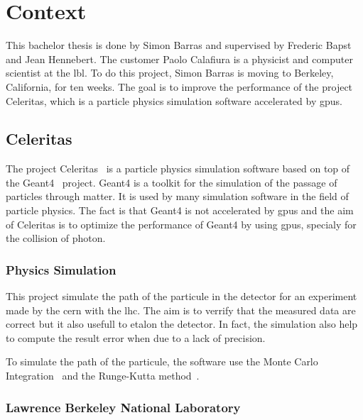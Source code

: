 \chapter{Context}
\label{spec:ch:context}

This bachelor thesis is done by Simon Barras and supervised by Frederic Bapst and Jean Hennebert.
The customer Paolo Calafiura is a physicist and computer scientist at the \acrfull{lbl}.
To do this project, Simon Barras is moving to Berkeley, California, for ten weeks.
The goal is to improve the performance of the project Celeritas, which is a particle physics simulation software accelerated by \acrshort{gpu}s.




\section{Celeritas}
\label{spec:ch:context:celeritas}

The project Celeritas~\cite{Celeritas-Project} is a particle physics simulation software based on top of the Geant4~\cite{Geant4} project.
Geant4 is a toolkit for the simulation of the passage of particles through matter.
It is used by many simulation software in the field of particle physics.
The fact is that Geant4 is not accelerated by \acrshort{gpu}s and the aim of Celeritas is to optimize the performance of Geant4 by using \acrshort{gpu}s, specialy for the collision of photon.



\subsection{Physics Simulation}
\label{spec:ch:context:celeritas:physics-simulation}

This project simulate the path of the particule in the detector for an experiment made by the \acrfull{cern} with the \acrfull{lhc}.
The aim is to verrify that the measured data are correct but it also usefull to etalon the detector.
In fact, the simulation also help to compute the result error when due to a lack of precision.

To simulate the path of the particule, the software use the Monte Carlo Integration~\cite{Monte-Carlo-integration} and the Runge-Kutta method~\cite{Runge-Kutta-methods}.


\subsection{Lawrence Berkeley National Laboratory}
\label{spec:ch:context:celeritas:lbl}

